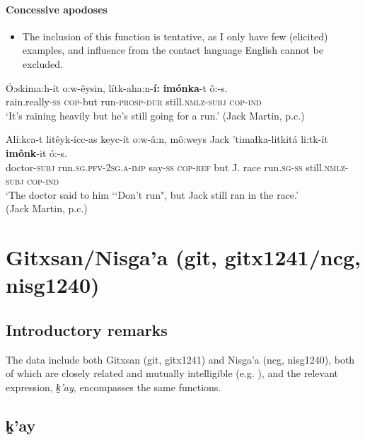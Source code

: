     \paragraph{Concessive apodoses}
\label{appendixCreekConcessiveConsequent}
\begin{itemize}
	\item The inclusion of this function is tentative, as I only have few (elicited) examples, and influence from the contact language English cannot be excluded.
\end{itemize}
\begin{exe}
	\ex
	\gll Ó:skima:h-ít	o:w-êysin,	lítk-aha:n-\textbf{í:}	\textbf{imónka}-t ô:-s.\\
	rain.really-\textsc{ss} \textsc{cop}-but run-\textsc{prosp}-\textsc{dur} still.\textsc{nmlz}-\textsc{subj} \textsc{cop}-\textsc{ind}\\
	\glt \lq It's raining heavily but he's still going for a run.' (Jack Martin, p.c.)
	
	\ex
	\gll Alí:kca-t litêyk-ícc-as keyc-ít o:w-â:n, mô:weys Jack 'timaɬka-litkitá li:tk-ít \textbf{imônk}-it ó:-s.\\
	doctor-\textsc{subj} run.\textsc{sg}.\textsc{pfv}-2\textsc{sg}.\textsc{a}-\textsc{imp} say-\textsc{ss} \textsc{cop}-\textsc{ref} but J. race run.\textsc{sg}-\textsc{ss} still.\textsc{nmlz}-\textsc{subj} \textsc{cop}-\textsc{ind}\\
	\glt \lq The doctor said to him \lq\lq Don't run", but Jack still ran in the race.'\\
	(Jack Martin, p.c.)
\end{exe}
   

\section{Gitxsan/Nisga'a (git, gitx1241/ncg, nisg1240)}
\subsection{Introductory remarks}
The data include both Gitxsan (git, gitx1241) and Nisga'a (ncg, nisg1240), both of which are closely related and mutually intelligible (e.g. \cite[21–22]{Rigsby1986}), and the relevant expression, \textit{k̠'ay}, encompasses the same functions. 

\subsection{k̠'ay}

